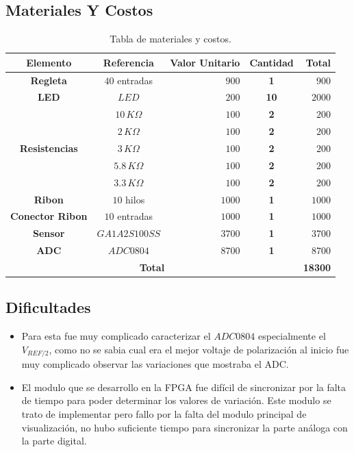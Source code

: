 \documentclass[12pt,graphicx,caption,rotating]{article}
\begin{document}
\subsection{Materiales Y Costos}
\begin{table}[H]
  \caption{Tabla de materiales y costos.}
  \centering
  \begin{tabular}{|c|c|r|c|r|}\hline
    \textbf{Elemento} & \textbf{Referencia} & \textbf{Valor Unitario} & \textbf{Cantidad} & \textbf{Total} \\ \hline
    \textbf{Regleta} & $40$ entradas & $900$ & \textbf{1} & $900$ \\ \hline
    \textbf{LED} & $LED$ & $200$ & \textbf{10} & $2000$ \\ \hline
    \textbf{} & $10\, K\Omega$ & $100$ & \textbf{2} & $200$ \\ \cline{ 2- 5}
    \textbf{} & $2\, K\Omega$ & $100$ & \textbf{2} & $200$ \\ \cline{ 2- 5}
    \multicolumn{ 1}{|c|}{\textbf{Resistencias}} & $3\, K\Omega$ & $100$ & \textbf{2} & $200$ \\ \cline{ 2- 5}
    \textbf{} & $5.8\, K\Omega$ & $100$ & \textbf{2} & $200$ \\ \cline{ 2- 5}
    \textbf{} & $3.3\, K\Omega$ & $100$ & \textbf{2} & $200$ \\ \hline
    \textbf{Ribon} & $10$ hilos & $1000$ & \textbf{1} & $1000$ \\ \hline
    \textbf{Conector Ribon} & $10$ entradas & $1000$ & \textbf{1} & $1000$ \\ \hline
    \textbf{Sensor} & $GA1A2S100SS$ & $3700$ & \textbf{1} & $3700$ \\ \hline
    \textbf{ADC} & $ADC0804$ & $8700$ & \textbf{1} & $8700$ \\ \hline
    \multicolumn{ 4}{|c|}{\textbf{Total}} & \textbf{18300} \\ \cline{ 5- 5}\hline
   \end{tabular}
   \label{tab2}
\end{table}

\subsection{Dificultades}
\begin{itemize}
 \item Para esta fue muy complicado caracterizar el $ADC0804$ especialmente el $V_{REF/2}$, como no se sabia cual era el mejor voltaje de polarización al inicio fue muy complicado observar las variaciones que mostraba el ADC.
 \item El modulo que se desarrollo en la FPGA fue difícil de sincronizar por la falta de tiempo para poder determinar los valores de variación. Este modulo se trato de implementar pero fallo por la falta del modulo principal de visualización, no hubo suficiente tiempo para sincronizar la parte análoga con la parte digital.
\end{itemize}
\end{document}
